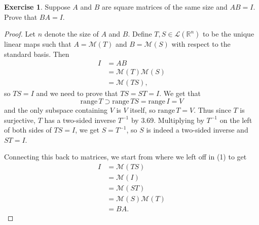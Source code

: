 \documentclass{article}
\theoremstyle{definition}
\newtheorem{ex}{Exercise}
\begin{document}
\begin{ex}
	Suppose $A$ and $B$ are square matrices of the same size and $AB = I$. Prove that $BA = I$.
\end{ex}
\begin{proof}
	Let $n$ denote the size of $A$ and $B$.
	Define $T, S \in \mathcal{L}(\mathbb{R}^n)$ to be the unique linear maps such that $A = \mathcal{M}(T)$ and $B = \mathcal{M}(S)$ with respect to the standard basis.
	Then \begin{align*}
		I & = AB                           \\
		  & = \mathcal{M}(T)\mathcal{M}(S) \\
		  & = \mathcal{M}(TS),\tag{1}
	\end{align*}
	so $TS = I$ and we need to prove that $TS = ST = I$.
	We get that \begin{equation*}
		\mathrm{range}\,T \supset \mathrm{range}\,TS = \mathrm{range}\,I = V
	\end{equation*}
	and the only subspace containing $V$ is $V$ itself, so $\mathrm{range}\,T = V$.
	Thus since $T$ is surjective, $T$ has a two-sided inverse $T^{-1}$ by 3.69.
	Multiplying by $T^{-1}$ on the left of both sides of $TS = I$, we get $S = T^{-1}$, so $S$ is indeed a two-sided inverse and $ST = I$.

	Connecting this back to matrices, we start from where we left off in (1) to get \begin{align*}
		I & = \mathcal{M}(TS)              \\
		  & = \mathcal{M}(I)               \\
		  & = \mathcal{M}(ST)              \\
		  & = \mathcal{M}(S)\mathcal{M}(T) \\
		  & = BA.
	\end{align*}
\end{proof}
\end{document}
